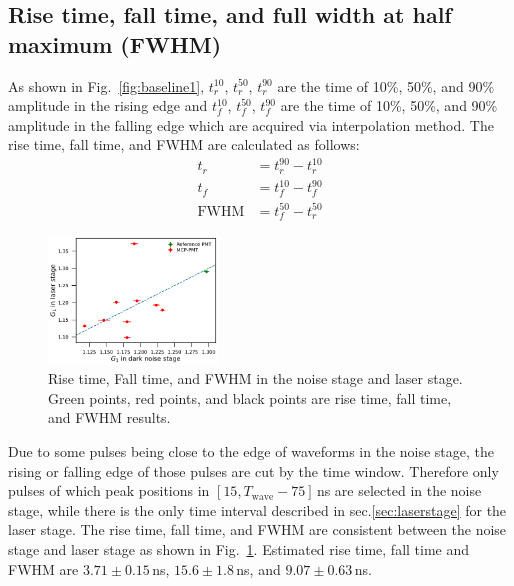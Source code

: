 \subsection{Rise time, fall time, and full width at half maximum (FWHM)}
As shown in Fig.~\ref{fig:baseline1}, $t^{10}_r$, $t^{50}_r$, $t^{90}_r$ are the time of 10\%, 50\%, and 90\% amplitude in the rising edge and $t^{10}_f$, $t^{50}_f$, $t^{90}_f$ are the time of 10\%, 50\%, and 90\% amplitude in the falling edge which are acquired via interpolation method. The rise time, fall time, and FWHM are calculated as follows:
\begin{align}
    t_r &= t^{90}_r - t^{10}_r\\
    t_f &= t^{10}_f - t^{90}_f\\
    \mathrm{FWHM} &= t^{50}_f - t^{50}_r
\end{align}
\begin{figure}[!htbp]
    \centering
    \includegraphics[width=0.4\textwidth,page=7]{figures/result/compare.pdf}
    \caption{Rise time, Fall time, and FWHM in the noise stage and laser stage. Green points, red points, and black points are rise time, fall time, and FWHM results.}
    \label{fig:RiseCompare}
\end{figure}
Due to some pulses being close to the edge of waveforms in the noise stage, the rising or falling edge of those pulses are cut by the time window. Therefore only pulses of which peak positions in $[15, T_{\mathrm{wave}}-75]$\,ns are selected in the noise stage, while there is the only time interval described in sec.\ref{sec:laserstage} for the laser stage.
 The rise time, fall time, and FWHM are consistent between the noise stage and laser stage as shown in Fig.~\ref{fig:RiseCompare}. Estimated rise time, fall time and FWHM are $3.71\pm0.15$\,ns, $15.6\pm1.8$\,ns, and $9.07\pm0.63$\,ns.

